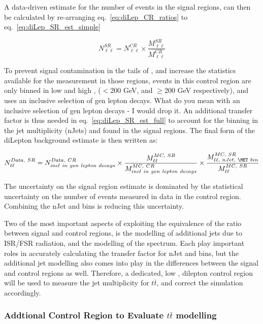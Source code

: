 A data-driven estimate for the number of events in the signal regions, can then be calculated by re-arranging eq.~\ref{eq:diLep_CR_ratios} to eq.~\ref{eq:diLep_SR_est_simple}

\begin{equation}\label{eq:diLep_SR_est_simple}
N^{SR}_{\ell\ell} = N^{CR}_{\ell\ell}\times
\frac{M^{SR}_{\ell\ell}}{M^{CR}_{\ell\ell}}
\end{equation}

To prevent signal contamination in the tails of \MET, and increase the statistics available for the measurement in those regions, events in this control region are only binned in low and high \MTtW, ($<$200 GeV, and $\ge$200 GeV respectively), and uses an inclusive selection of gen lepton decays.  {\color{red} What do you mean with an inclusive selection of gen lepton decays - I would drop it}. 
An additional transfer factor is thus needed in eq.~\ref{eq:diLep_SR_est_full} to account for the binning in the jet multiplicity (nJets) and \MET found in the signal regions.  The final form of the diLepton background estimate is then written as:

\begin{equation}\label{eq:diLep_SR_est_full}
N^{Data,~SR}_{\ell\ell} = N^{Data,~CR}_{incl~in~gen~lepton~decays}\times
\frac{M^{MC,~SR}_{\ell\ell}}{M^{MC,~CR}_{incl~in~gen~lepton~decays}}\times
\frac{M^{MC,~SR}_{\ell\ell,~nJet,~\MET~bin}}{M^{MC,~SR}_{\ell\ell}}
\end{equation}

The uncertainty on the signal region estimate is dominated by the statistical uncertainty on the number of events measured in data 
in the control region. %
Combining the nJet and \MET bins is reducing this uncertainty.  

Two of the most important aspects of exploiting the equivalence of the ratio between signal and control regions, is the modelling of additional 
jets due to ISR/FSR radiation, and the modelling of the \MET spectrum.  
Each play important roles in accurately calculating the transfer factor for nJet and \MET bins, but the additional jet modelling also comes 
into play in the differences between the signal and control regions as well. 
Therefore, a dedicated, low \MET, dilepton control region will be 
used to measure the jet multiplicity for $t\bar{t}$, and correct the simulation accordingly.      

\subsubsection{Addtional Control Region to Evaluate $t\bar{t}$ modelling}
\label{sec:bkgLL:emu_CR}

